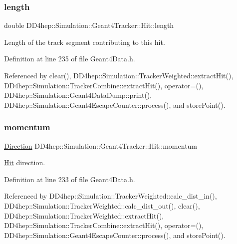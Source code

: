 \subsubsection{\texorpdfstring{length}{length}}
{\footnotesize\ttfamily double D\+D4hep\+::\+Simulation\+::\+Geant4\+Tracker\+::\+Hit\+::length}



Length of the track segment contributing to this hit. 



Definition at line 235 of file Geant4\+Data.\+h.



Referenced by clear(), D\+D4hep\+::\+Simulation\+::\+Tracker\+Weighted\+::extract\+Hit(), D\+D4hep\+::\+Simulation\+::\+Tracker\+Combine\+::extract\+Hit(), operator=(), D\+D4hep\+::\+Simulation\+::\+Geant4\+Data\+Dump\+::print(), D\+D4hep\+::\+Simulation\+::\+Geant4\+Escape\+Counter\+::process(), and store\+Point().

\hypertarget{class_d_d4hep_1_1_simulation_1_1_geant4_tracker_1_1_hit_abdd1f621f202ef83c2078a52cbb242b3}{}\label{class_d_d4hep_1_1_simulation_1_1_geant4_tracker_1_1_hit_abdd1f621f202ef83c2078a52cbb242b3} 
\subsubsection{\texorpdfstring{momentum}{momentum}}
{\footnotesize\ttfamily \hyperlink{namespace_d_d4hep_1_1_geometry_a56730a0ddb9f3f089c415cd693bd7c19}{Direction} D\+D4hep\+::\+Simulation\+::\+Geant4\+Tracker\+::\+Hit\+::momentum}



\hyperlink{class_d_d4hep_1_1_simulation_1_1_geant4_tracker_1_1_hit}{Hit} direction. 



Definition at line 233 of file Geant4\+Data.\+h.



Referenced by D\+D4hep\+::\+Simulation\+::\+Tracker\+Weighted\+::calc\+\_\+dist\+\_\+in(), D\+D4hep\+::\+Simulation\+::\+Tracker\+Weighted\+::calc\+\_\+dist\+\_\+out(), clear(), D\+D4hep\+::\+Simulation\+::\+Tracker\+Weighted\+::extract\+Hit(), D\+D4hep\+::\+Simulation\+::\+Tracker\+Combine\+::extract\+Hit(), operator=(), D\+D4hep\+::\+Simulation\+::\+Geant4\+Escape\+Counter\+::process(), and store\+Point().

